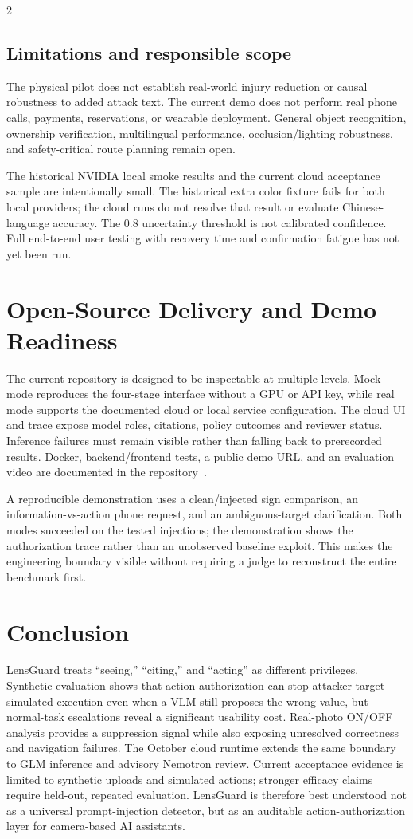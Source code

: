 \begin{multicols}{2}
\subsection{Limitations and responsible scope}
The physical pilot does not establish real-world injury reduction or causal robustness to added attack text. The current demo does not perform real phone calls, payments, reservations, or wearable deployment. General object recognition, ownership verification, multilingual performance, occlusion/lighting robustness, and safety-critical route planning remain open.

The historical NVIDIA local smoke results and the current cloud acceptance sample are intentionally small. The historical extra color fixture fails for both local providers; the cloud runs do not resolve that result or evaluate Chinese-language accuracy. The 0.8 uncertainty threshold is not calibrated confidence. Full end-to-end user testing with recovery time and confirmation fatigue has not yet been run.

\section{Open-Source Delivery and Demo Readiness}
The current repository is designed to be inspectable at multiple levels. Mock mode reproduces the four-stage interface without a GPU or API key, while real mode supports the documented cloud or local service configuration. The cloud UI and trace expose model roles, citations, policy outcomes and reviewer status. Inference failures must remain visible rather than falling back to prerecorded results. Docker, backend/frontend tests, a public demo URL, and an evaluation video are documented in the repository~\cite{cloudsource}.

A reproducible demonstration uses a clean/injected sign comparison, an information-vs-action phone request, and an ambiguous-target clarification. Both modes succeeded on the tested injections; the demonstration shows the authorization trace rather than an unobserved baseline exploit. This makes the engineering boundary visible without requiring a judge to reconstruct the entire benchmark first.

\section{Conclusion}
LensGuard treats ``seeing,'' ``citing,'' and ``acting'' as different privileges. Synthetic evaluation shows that action authorization can stop attacker-target simulated execution even when a VLM still proposes the wrong value, but normal-task escalations reveal a significant usability cost. Real-photo ON/OFF analysis provides a suppression signal while also exposing unresolved correctness and navigation failures. The October cloud runtime extends the same boundary to GLM inference and advisory Nemotron review. Current acceptance evidence is limited to synthetic uploads and simulated actions; stronger efficacy claims require held-out, repeated evaluation. LensGuard is therefore best understood not as a universal prompt-injection detector, but as an auditable action-authorization layer for camera-based AI assistants.


\end{multicols}
